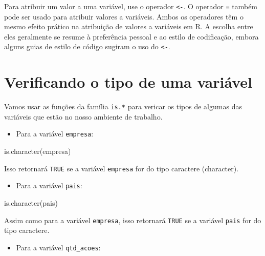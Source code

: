 \documentclass[
  letterpaper,
  DIV=11,
  numbers=noendperiod]{scrreprt}
\newenvironment{Shaded}{\begin{snugshade}}{\end{snugshade}}
\newcommand{\FunctionTok}[1]{\textcolor[rgb]{0.28,0.35,0.67}{#1}}
\newcommand{\NormalTok}[1]{\textcolor[rgb]{0.00,0.23,0.31}{#1}}
\providecommand{\tightlist}{%
  \setlength{\itemsep}{0pt}\setlength{\parskip}{0pt}}\usepackage{longtable,booktabs,array}
\begin{document}
Para atribuir um valor a uma variável, use o operador
\texttt{\textless{}-}. O operador \texttt{=} também pode ser usado para
atribuir valores a variáveis. Ambos os operadores têm o mesmo efeito
prático na atribuição de valores a variáveis em R. A escolha entre eles
geralmente se resume à preferência pessoal e ao estilo de codificação,
embora alguns guias de estilo de código sugiram o uso do
\texttt{\textless{}-}.

\hypertarget{verificando-o-tipo-de-uma-variuxe1vel}{%
\section{Verificando o tipo de uma
variável}\label{verificando-o-tipo-de-uma-variuxe1vel}}

Vamos usar as funções da família \texttt{is.*} para vericar os tipos de
algumas das variáveis que estão no nosso ambiente de trabalho.

\begin{itemize}
\tightlist
\item
  Para a variável \texttt{empresa}:
\end{itemize}

\begin{Shaded}
\begin{Highlighting}[]
\FunctionTok{is.character}\NormalTok{(empresa)}
\end{Highlighting}
\end{Shaded}

Isso retornará \texttt{TRUE} se a variável \texttt{empresa} for do tipo
caractere (character).

\begin{itemize}
\tightlist
\item
  Para a variável \texttt{pais}:
\end{itemize}

\begin{Shaded}
\begin{Highlighting}[]
\FunctionTok{is.character}\NormalTok{(pais)}
\end{Highlighting}
\end{Shaded}

Assim como para a variável \texttt{empresa}, isso retornará
\texttt{TRUE} se a variável \texttt{pais} for do tipo caractere.

\begin{itemize}
\tightlist
\item
  Para a variável \texttt{qtd\_acoes}:
\end{itemize}
\end{document}
